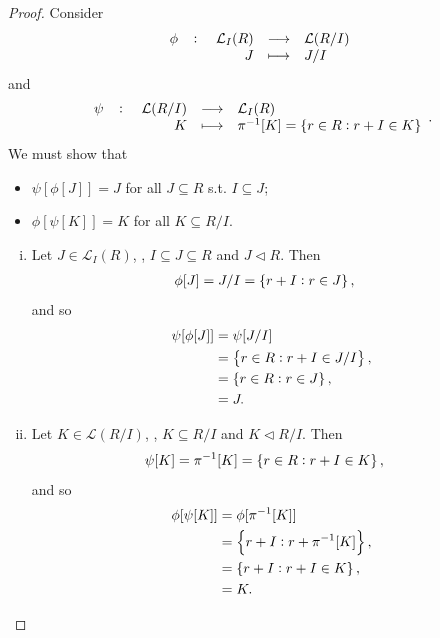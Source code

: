 \documentclass[11pt,openany]{article}
\begin{document}
	\begin{proof}
		Consider \[
		\fullfunction{\phi}{\mathcal{L}_I(R)}{\mathcal{L}(R/I)}{J}{J/I}
		\] and \[
		\fullfunction{\psi}{\mathcal{L}(R/I)}{\mathcal{L}_I(R)}{K}{\pi^{-1}[K]=\set{r\in R:r+I\in K}}.
		\] We must show that \begin{itemize}
			\item $\psi[\phi[J]]=J$ for all $J\subseteq R$ s.t. $I\subseteq J$;
			\item $\phi[\psi[K]]=K$ for all $K\subseteq R/I$.
		\end{itemize}
		\begin{enumerate}[(i)]
			\item Let $J\in\mathcal{L}_I(R)$, \ie, $I\subseteq J\subseteq R$ and $J\lhd R$. Then \begin{align*}
				\phi[J] &= J/I=\set{r+I:r\in J},	
			\end{align*} and so \begin{align*}
				\psi[\phi[J]] &= \psi[J/I]\\
				&=\set{r\in R:r+I\in J/I},\\
				&=\set{r\in R:r\in J},\\
				&= J.
			\end{align*}
			\item Let $K\in\mathcal{L}(R/I)$, \ie, $K\subseteq R/I$ and $K\lhd R/I$. Then \begin{align*}
				\psi[K] &= \pi^{-1}[K]=\set{r\in R:r+I\in K},	
			\end{align*} and so \begin{align*}
				\phi[\psi[K]] &= \phi[\pi^{-1}[K]]\\
				&=\set{r+I:r+\pi^{-1}[K]},\\
				&=\set{r+I:r+I\in K},\\
				&= K.
			\end{align*}
		\end{enumerate}
	\end{proof}
\end{document}

